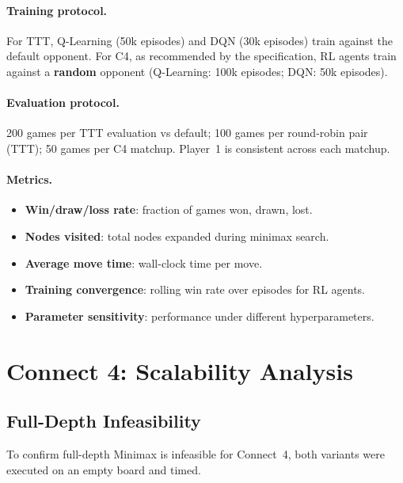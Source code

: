 \documentclass[12pt, a4paper]{article}
\begin{document}
\paragraph{Training protocol.}
For TTT, Q-Learning (50k episodes) and DQN (30k episodes) train against the default opponent.
For C4, as recommended by the specification, RL agents train against a \textbf{random} opponent
(Q-Learning: 100k episodes; DQN: 50k episodes).

\paragraph{Evaluation protocol.}
200 games per TTT evaluation vs default; 100 games per round-robin pair (TTT); 50 games per
C4 matchup. Player~1 is consistent across each matchup.

\paragraph{Metrics.}
\begin{itemize}
    \item \textbf{Win/draw/loss rate}: fraction of games won, drawn, lost.
    \item \textbf{Nodes visited}: total nodes expanded during minimax search.
    \item \textbf{Average move time}: wall-clock time per move.
    \item \textbf{Training convergence}: rolling win rate over episodes for RL agents.
    \item \textbf{Parameter sensitivity}: performance under different hyperparameters.
\end{itemize}


\section{Connect 4: Scalability Analysis}
\label{sec:scalability}

\subsection{Full-Depth Infeasibility}

To confirm full-depth Minimax is infeasible for Connect~4, both variants were executed on an
empty board and timed.

\end{document}
